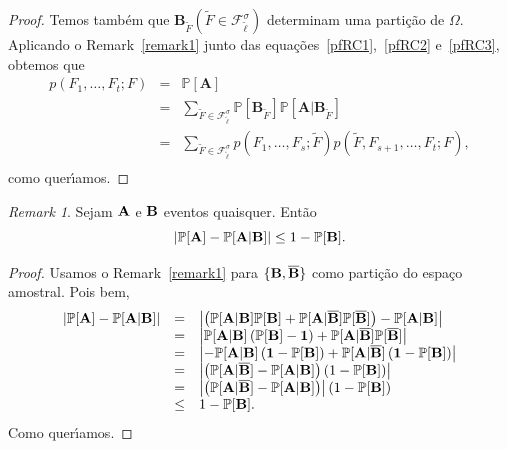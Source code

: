\documentclass{amsart}
\theoremstyle{theorem}
\theoremstyle{definition}
\theoremstyle{remark}
\newtheorem{remark}{Remark}[section]
\numberwithin{equation}{section}
\begin{document}
\begin{proof}
Temos tamb\'{e}m que $\mathbf{B}_{\tilde{F}} (\tilde{F}\in\mathcal{F}^{\sigma}_{\tilde{\ell}})$ determinam uma parti\c{c}\~{a}o de $\Omega$. Aplicando o Remark~\ref{remark1} junto das equa\c{c}\~{o}es~\ref{pfRC1},~\ref{pfRC2} e~\ref{pfRC3}, obtemos que
\begin{equation*}
\begin{array}{rcl}
       p(F_1,\ldots,F_t;F) &=& \mathbb{P}[\mathbf{A}]\\
        &=& \displaystyle{\sum_{\tilde{F}\in\mathcal{F}^{\sigma}_{\tilde{\ell}}} \mathbb{P}[\mathbf{B}_{\tilde{F}}] \mathbb{P}[\mathbf{A}|\mathbf{B}_{\tilde{F}}]}\\
        &=& \displaystyle{\sum_{\tilde{F}\in\mathcal{F}^{\sigma}_{\tilde{\ell}}} p(F_1,\ldots,F_s;\tilde{F}) p(\tilde{F},F_{s+1},\ldots,F_t;F)},\\
\end{array}
\end{equation*}
como quer\'{\i}amos.
\end{proof}

\begin{remark}\label{remark2}
  Sejam $\bf{A}$ e $\bf{B}$ eventos quaisquer. Ent\~{a}o
  \begin{equation}
    \left| \mathbb{P}[\bf{A}] - \mathbb{P}[\bf{A}|\bf{B}] \right| \leq 1 - \mathbb{P}[\bf{B}].
  \end{equation}


\begin{proof}
  Usamos o Remark~\ref{remark1} para $\{\bf{B},\overline{\bf{B}}\}$ como parti\c{c}\~{a}o do espa\c{c}o amostral. Pois bem,
  \begin{equation*}
  \begin{array}{rcl}
   \displaystyle{\left|\mathbb{P}[\bf{A}] -  \mathbb{P}[\bf{A}|\bf{B}] \right|} &=& \left|\left( \mathbb{P}[\bf{A}|\bf{B}] \mathbb{P}[\bf{B}] + \mathbb{P}[\bf{A}|\overline{\bf{B}}] \mathbb{P}[\overline{\bf{B}}] \right) -  \mathbb{P}[\bf{A}|\bf{B}] \right| \\
   &=& \left| \mathbb{P}[\bf{A}|\bf{B}] \left(\mathbb{P}[\bf{B}] - 1 \right) + \mathbb{P}[\bf{A}|\overline{\bf{B}}] \mathbb{P}[\overline{\bf{B}}]  \right| \\
   &=& \left| - \mathbb{P}[\bf{A}|\bf{B}] \left(1 - \mathbb{P}[\bf{B}] \right) + \mathbb{P}[\bf{A}|\overline{\bf{B}}] \left(1 - \mathbb{P}[\bf{B}] \right) \right| \\
   &=& \left| \left( \mathbb{P}[\bf{A}|\overline{\bf{B}}] - \mathbb{P}[\bf{A}|\bf{B}] \right) \left(1 - \mathbb{P}[\bf{B}]\right)\right| \\
   &=& \left| \left( \mathbb{P}[\bf{A}|\overline{\bf{B}}] - \mathbb{P}[\bf{A}|\bf{B}] \right) \right| \left(1 - \mathbb{P}[\bf{B}]\right) \\
   &\leq &  1 - \mathbb{P}[\bf{B}].
  \end{array}
  \end{equation*}
  Como quer\'{\i}amos.
\end{proof}
\end{remark}
\end{document}
